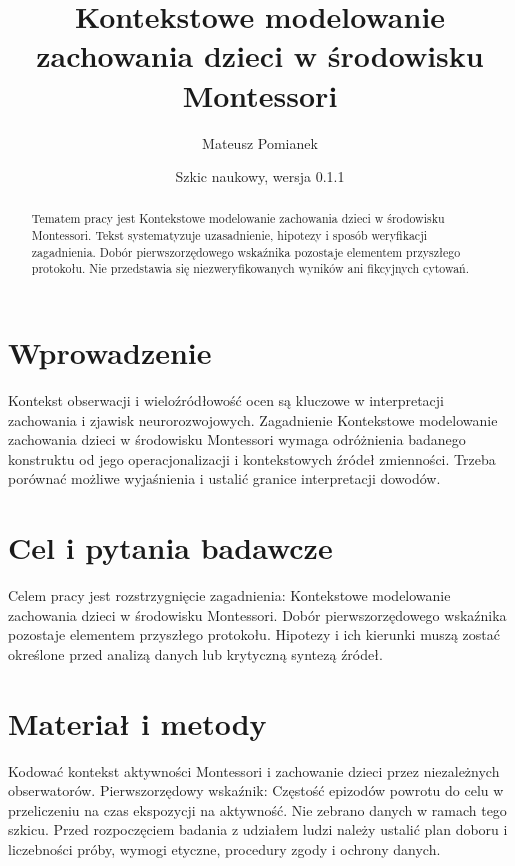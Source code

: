 \documentclass[11pt,a4paper]{article}
\title{Kontekstowe modelowanie zachowania dzieci w środowisku Montessori}
\author{Mateusz Pomianek}
\date{Szkic naukowy, wersja 0.1.1}
\begin{document}
\maketitle

\begin{abstract}

Tematem pracy jest Kontekstowe modelowanie zachowania dzieci w środowisku Montessori. Tekst systematyzuje uzasadnienie, hipotezy i sposób weryfikacji zagadnienia. Dobór pierwszorzędowego wskaźnika pozostaje elementem przyszłego protokołu. Nie przedstawia się niezweryfikowanych wyników ani fikcyjnych cytowań.

\end{abstract}

\section{Wprowadzenie}

Kontekst obserwacji i wieloźródłowość ocen są kluczowe w interpretacji zachowania i zjawisk neurorozwojowych. Zagadnienie Kontekstowe modelowanie zachowania dzieci w środowisku Montessori wymaga odróżnienia badanego konstruktu od jego operacjonalizacji i kontekstowych źródeł zmienności. Trzeba porównać możliwe wyjaśnienia i ustalić granice interpretacji dowodów.

\section{Cel i pytania badawcze}

Celem pracy jest rozstrzygnięcie zagadnienia: Kontekstowe modelowanie zachowania dzieci w środowisku Montessori. Dobór pierwszorzędowego wskaźnika pozostaje elementem przyszłego protokołu. Hipotezy i ich kierunki muszą zostać określone przed analizą danych lub krytyczną syntezą źródeł.

\section{Materiał i metody}

Kodować kontekst aktywności Montessori i zachowanie dzieci przez niezależnych obserwatorów. Pierwszorzędowy wskaźnik: Częstość epizodów powrotu do celu w przeliczeniu na czas ekspozycji na aktywność. Nie zebrano danych w ramach tego szkicu. Przed rozpoczęciem badania z udziałem ludzi należy ustalić plan doboru i liczebności próby, wymogi etyczne, procedury zgody i ochrony danych.
\end{document}
